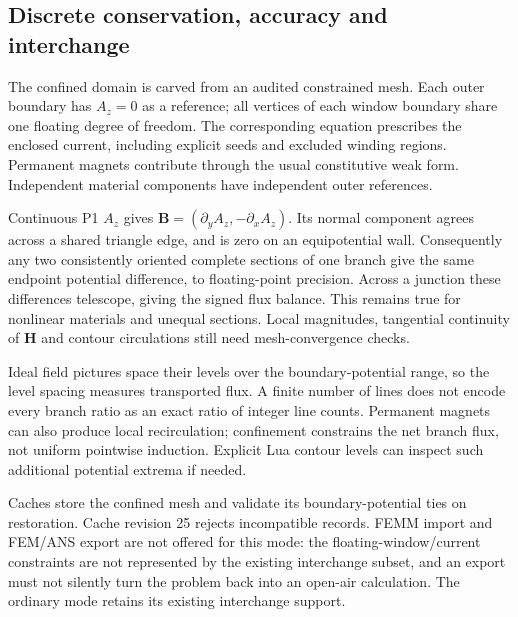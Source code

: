
\begin{codeexample}[width=0pt]
\end{codeexample}


\subsection{Discrete conservation, accuracy and interchange}
The confined domain is carved from an audited constrained mesh. Each outer
boundary has $A_z=0$ as a reference; all vertices of each window boundary
share one floating degree of freedom. The corresponding equation prescribes
the enclosed current, including explicit seeds and excluded winding regions.
Permanent magnets contribute through the usual constitutive weak form.
Independent material components have independent outer references.

Continuous P1 $A_z$ gives $\mathbf B=(\partial_y A_z,-\partial_x A_z)$.
Its normal component agrees across a shared triangle edge, and is zero on
an equipotential wall. Consequently any two consistently oriented complete
sections of one branch give the same endpoint potential difference, to
floating-point precision. Across a junction these differences telescope,
giving the signed flux balance. This remains true for nonlinear materials
and unequal sections. Local magnitudes, tangential continuity of $\mathbf H$
and contour circulations still need mesh-convergence checks.

Ideal field pictures space their levels over the boundary-potential range,
so the level spacing measures transported flux. A finite number of lines
does not encode every branch ratio as an exact ratio of integer line counts.
Permanent magnets can also produce local recirculation; confinement constrains
the net branch flux, not uniform pointwise induction. Explicit Lua contour
levels can inspect such additional potential extrema if needed.

Caches store the confined mesh and validate its boundary-potential ties on
restoration. Cache revision 25 rejects incompatible records. FEMM import
and FEM/ANS export are not offered for this mode: the floating-window/current
constraints are not represented by the existing interchange subset, and an
export must not silently turn the problem back into an open-air calculation.
The ordinary mode retains its existing interchange support.
